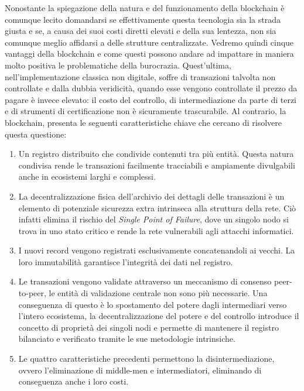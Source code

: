 Nonostante la spiegazione della natura e del funzionamento della blockchain è comunque
lecito domandarsi se effettivamente questa tecnologia sia la strada giusta e se, a
causa dei suoi costi diretti elevati e della sua lentezza, non sia comunque meglio
affidarsi a delle strutture centralizzate.
Vedremo quindi cinque vantaggi della blockchain e come questi possono andare ad impattare
in maniera molto positiva le problematiche della burocrazia.
Quest'ultima, nell'implementazione classica non digitale, soffre di transazioni talvolta
non controllate e dalla dubbia veridicità, quando esse vengono controllate il prezzo
da pagare è invece elevato: il costo del controllo, di intermediazione da parte di terzi
e di strumenti di certificazione non è sicuramente trascurabile.
Al contrario, la blockchain, presenta le seguenti caratteristiche chiave che cercano di
risolvere questa questione:
\begin{enumerate}
    \item Un registro distribuito che condivide contenuti tra più entità.
    Questa natura condivisa rende le transazioni facilmente tracciabili e
    ampiamente divulgabili anche in ecosistemi larghi e complessi.
    \item La decentralizzazione fisica dell'archivio dei dettagli delle transazioni
    è un elemento di potenziale sicurezza extra intrinseca alla struttura della rete.
    Ciò infatti elimina il rischio del \emph{Single Point of Failure}, dove un singolo
    nodo si trova in uno stato critico e rende la rete vulnerabili agli attacchi informatici.
    \item I nuovi record vengono registrati esclusivamente concatenandoli ai vecchi.
    La loro immutabilità garantisce l'integrità dei dati nel registro.
    \item Le transazioni vengono validate attraverso un meccanismo di consenso peer-to-peer,
    le entità di validazione centrale non sono più necessarie.
    Una conseguenza di questo è lo spostamento del potere dagli intermediari verso
    l'intero ecosistema, la decentralizzazione del potere e del controllo introduce
    il concetto di proprietà dei singoli nodi e permette di mantenere il registro
    bilanciato e verificato tramite le sue metodologie intrinsiche.
    \item Le quattro caratteristiche precedenti permettono la disintermediazione,
    ovvero l'eliminazione di middle-men e intermediatori, eliminando di conseguenza
    anche i loro costi.
\end{enumerate}

